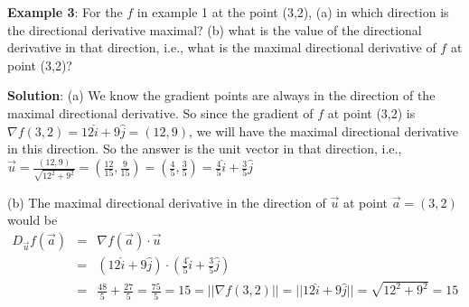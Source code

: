 \documentclass[conference,final,11pt,technote,onecolumn]{IEEEtran}\usepackage[]{graphicx}\usepackage[]{color}
\begin{document}
\textbf{Example 3}: For the $f$ in example 1 at the point (3,2), (a) in which direction is the directional derivative maximal? (b) what is the value of the directional derivative in that direction, i.e., what is the maximal directional derivative of $f$ at point (3,2)?

\textbf{Solution}: (a) We know the gradient points are always in the direction of the maximal directional derivative. So since the gradient of $f$ at point (3,2) is $\nabla f(3,2) = 12\hat{i} + 9\hat{j} = (12,9)$, we will have the maximal directional derivative in this direction. So the answer is the unit vector in that direction, i.e., $\vec u = \frac{(12,9)}{\sqrt{12^2+9^2}} = (\frac{12}{15},\frac{9}{15}) = (\frac{4}{5},\frac{3}{5}) = \frac{4}{5}\hat{i}+\frac{3}{5}\hat{j}$

(b) The maximal directional derivative in the direction of $\vec u$ at point $\vec a =(3,2)$ would be
\begin{eqnarray}
\nonumber D_{\vec u}f(\vec a) &=& \nabla f(\vec a)\cdot \vec u\\
\nonumber &=& (12\hat{i}+9\hat{j})\cdot (\frac{4}{5}\hat{i} + \frac{3}{5}\hat{j})\\
\nonumber &=& \frac{48}{5} + \frac{27}{5} = \frac{75}{5} = 15 = ||\nabla f(3,2)|| = ||12\hat{i}+9\hat{j}|| =  \sqrt{12^2+9^2} = 15
\end{eqnarray}
	
	
\end{document}
